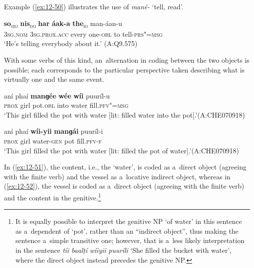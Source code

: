 Example (\ref{ex:12-50}) illustrates the use of \textit{mané-} `tell, read'.

\begin{exe}
\ex
\label{ex:12-50}
\gll {\ob}\textbf{so}{\cb}\textsubscript{\textsc{\upshape sbj}} {\ob}\textbf{nis}{\cb}\textsubscript{\textsc{\upshape do}} {\ob}\textbf{har} \textbf{áak-a} \textbf{the}{\cb}\textsubscript{\textsc{\upshape io}} man-áan-u \\
\textsc{3sg.nom} \textsc{3sg.prox.acc} every one-\textsc{obl} to tell-\textsc{prs"=msg} \\
\glt `He's telling everybody about it.' (A:Q9.575)
\end{exe}

With some verbs of this kind, an~alternation in coding between the two objects is possible; each corresponds to the particular perspective taken describing what is virtually one and the same event. 

\begin{exe}
\ex
\label{ex:12-51}
\gll aní phaí \textbf{manɡée} \textbf{wée} \textbf{wíi} puuríl-u \\
\textsc{prox} girl pot.\textsc{obl} into water fill.\textsc{pfv"=msg} \\
\glt `This girl filled the pot with water [lit: filled water into the pot].'\newline (A:CHE070918)
\end{exe}
\begin{exe}
\ex
\label{ex:12-52}
\gll aní phaí \textbf{wíi-yii} \textbf{manɡái} puuríl-i \\
\textsc{prox} girl water-\textsc{gen} pot fill.\textsc{pfv-f} \\
\glt `This girl filled the pot with water [lit: filled the pot of water].'\newline (A:CHE070918)
\end{exe}

In (\ref{ex:12-51}), the content, i.e., the `water', is coded as a~direct object (agreeing with the finite verb) and the vessel as a~locative indirect object, whereas in (\ref{ex:12-52}), the vessel is coded as a~direct object (agreeing with the finite verb) and the content in the genitive.\footnote{It is equally possible to interpret the genitive NP `of water' in this sentence as a~dependent of `pot', rather than an ``indirect object'', thus making the sentence a~simple transitive one; however, that is a~less likely interpretation in the sentence \textit{tíi baalṭí wíiyii puuríli} `She filled the bucket with water', where the direct object instead precedes the genitive NP.} 


